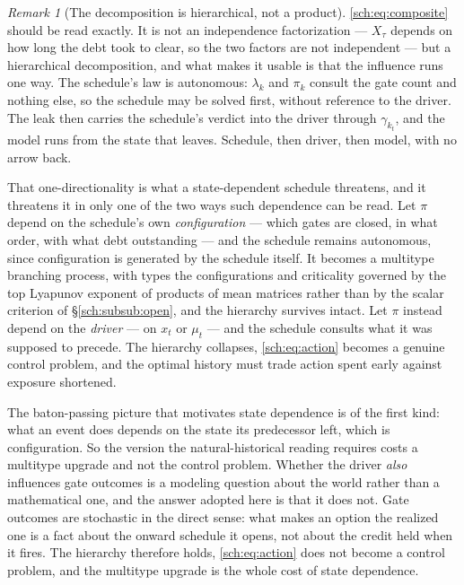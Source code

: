 \documentclass[11pt]{article}
\numberwithin{equation}{section}
\theoremstyle{plain}
\theoremstyle{definition}
\theoremstyle{remark}
\newtheorem{remark}[theorem]{Remark}
\begin{document}
\begin{remark}[The decomposition is hierarchical, not a product]
\label{sch:rem:hierarchical}
\eqref{sch:eq:composite} should be read exactly. It is not an
independence factorization --- $X_\tau$ depends on how long the debt
took to clear, so the two factors are not independent --- but a
hierarchical decomposition, and what makes it usable is that the
influence runs one way. The schedule's law is autonomous: $\lambda_k$
and $\pi_k$ consult the gate count and nothing else, so the schedule may
be solved first, without reference to the driver. The leak then carries
the schedule's verdict into the driver through $\gamma_{k_t}$, and the
model runs from the state that leaves. Schedule, then driver, then
model, with no arrow back.

That one-directionality is what a state-dependent schedule threatens,
and it threatens it in only one of the two ways such dependence can be
read. Let $\pi$ depend on the schedule's own \emph{configuration} ---
which gates are closed, in what order, with what debt outstanding ---
and the schedule remains autonomous, since configuration is generated by
the schedule itself. It becomes a multitype branching process, with
types the configurations and criticality governed by the top Lyapunov
exponent of products of mean matrices rather than by the scalar
criterion of \S\ref{sch:subsub:open}, and the hierarchy survives intact.
Let $\pi$ instead depend on the \emph{driver} --- on $x_t$ or $\mu_t$
--- and the schedule consults what it was supposed to precede. The
hierarchy collapses, \eqref{sch:eq:action} becomes a genuine control
problem, and the optimal history must trade action spent early against
exposure shortened.

The baton-passing picture that motivates state dependence is of the
first kind: what an event does depends on the state its predecessor
left, which is configuration. So the version the natural-historical
reading requires costs a multitype upgrade and not the control problem.
Whether the driver \emph{also} influences gate outcomes is a modeling
question about the world rather than a mathematical one, and the answer
adopted here is that it does not. Gate outcomes are stochastic in the
direct sense: what makes an option the realized one is a fact about the
onward schedule it opens, not about the credit held when it fires. The
hierarchy therefore holds, \eqref{sch:eq:action} does not become a
control problem, and the multitype upgrade is the whole cost of state
dependence.


\end{remark}
\end{document}
